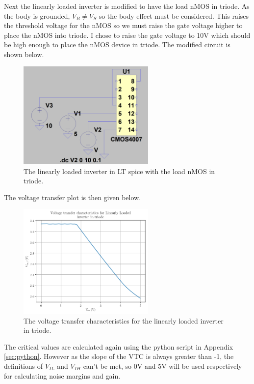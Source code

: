 \documentclass[titlepage, 12pt]{article}
\begin{document}
    Next the linearly loaded inverter is modified to have the load nMOS
    in triode. As the body is grounded, $V_{B} \neq V_{S}$ so the body
    effect must be considered. This raises the threshold voltage for the
    nMOS so we must raise the gate voltage higher to place the nMOS into
    triode. I chose to raise the gate voltage to 10V which should be
    high enough to place the nMOS device in triode. The modified circuit
    is shown below.
    \begin{figure}[H]
        \centering

        \includegraphics[width=0.6\textwidth]{figures/part_2a_tri_circ.png}
        \caption{The linearly loaded inverter in LT spice with the load
        nMOS in triode.}
    \end{figure}
    The voltage transfer plot is then given below.
    \begin{figure}[H]
        \centering
        \includegraphics[width=0.6\textwidth]{figures/part_2a_tri.png}
        \caption{The voltage transfer characteristics for the linearly
        loaded inverter in triode.}
    \end{figure}
    The critical values are calculated again using the python script in
    Appendix \ref{sec:python}. However as the slope of the VTC is always
    greater than -1, the definitions of $V_{IL}$ and $V_{IH}$ can't be
    met, so 0V and 5V will be used respectively for calculating noise
    margins and gain.
\end{document}
